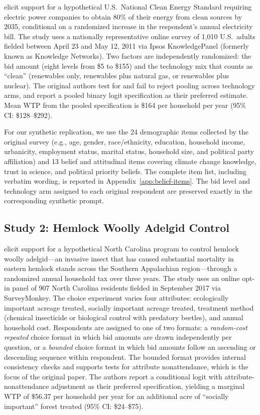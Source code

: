 \documentclass[12pt]{article}
\begin{document}
\textcite{Aldy2012} elicit support for a hypothetical U.S.\ National Clean
Energy Standard requiring electric power companies to obtain 80\% of their
energy from clean sources by 2035, conditional on a randomized increase in
the respondent's annual electricity bill. The study uses a nationally
representative online survey of 1{,}010 U.S.\ adults fielded between
April 23 and May 12, 2011 via Ipsos KnowledgePanel (formerly known as Knowledge Networks). Two
factors are independently randomized: the bid amount (eight levels from
\$5 to \$155) and the technology mix that counts as ``clean'' (renewables
only, renewables plus natural gas, or renewables plus nuclear). The
original authors test for and fail to reject pooling across technology
arms, and report a pooled binary logit specification as their preferred
estimate. Mean WTP from the pooled specification is \$164 per household
per year (95\% CI: \$128--\$292).

For our synthetic replication, we use the 24 demographic items
collected by the original survey (e.g., age, gender, race/ethnicity, education,
household income, urbanicity, employment status, marital status, household size,
and political party affiliation) and 13 belief and attitudinal items
covering climate
change knowledge, trust in science, and political priority beliefs. The complete item list, including verbatim wording, is
reported in Appendix~\ref{app:belief-items}. The bid level and technology
arm assigned to each original respondent are preserved exactly in the
corresponding synthetic prompt.

\subsection{Study 2: Hemlock Woolly Adelgid Control}\label{sec:data-hwa}

\textcite{Giguere2020} elicit support for a hypothetical North Carolina
program to control hemlock woolly adelgid---an invasive insect that has
caused substantial mortality in eastern hemlock stands across the Southern
Appalachian region---through a randomized annual household tax over three
years. The study uses an online opt-in panel of 907 North Carolina
residents fielded in September 2017 via SurveyMonkey.
The choice experiment varies four attributes: ecologically important
acreage treated, socially important acreage treated, treatment method
(chemical insecticide or biological control with predatory beetles), and
annual household cost. Respondents are assigned to one of two formats: a
\textit{random-cost repeated} choice format in which bid amounts are drawn
independently per question, or a \textit{bounded} choice format in which
bid amounts follow an ascending or descending sequence within respondent.
The bounded format provides internal consistency checks and supports tests
for attribute nonattendance, which is the focus of the original paper.
The authors report a conditional logit with attribute-nonattendance
adjustment as their preferred specification, yielding a marginal WTP of
\$56.37 per household per year for an additional acre of ``socially
important'' forest treated (95\% CI: \$24--\$75).
\end{document}
